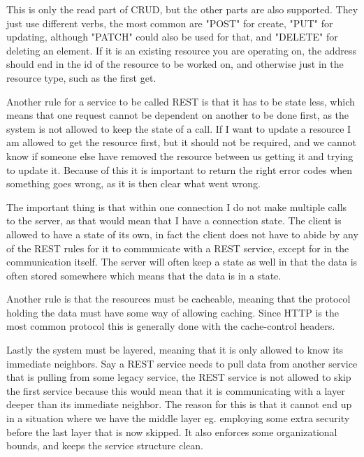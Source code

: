 This is only the read part of CRUD, but the other parts are also supported. They
just use different verbs, the most common are "POST" for create, "PUT" for
updating, although "PATCH" could also be used for that, and "DELETE" for
deleting an element. If it is an existing resource you are operating on, the
address should end in the id of the resource to be worked on, and otherwise just
in the resource type, such as the first get. 

Another rule for a service to be called REST is that it has to be state less,
which means that one request cannot be dependent on another to be done first, as
the system is not allowed to keep the state of a call. If I want to update a
resource I am allowed to get the resource first, but it should not be required,
and we cannot know if someone else have removed the resource between us getting
it and trying to update it. Because of this it is important to return the right
error codes when something goes wrong, as it is then clear what went wrong. 

The important thing is that within one connection I do not make multiple calls
to the server, as that would mean that I have a connection state. The client is
allowed to have a state of its own, in fact the client does not have to abide by
any of the REST rules for it to communicate with a REST service, except for in
the communication itself. The server will often keep a state as well in that the
data is often stored somewhere which means that the data is in a state. 

Another rule is that the resources must be cacheable, meaning that the protocol
holding the data must have some way of allowing caching. Since HTTP is the most
common protocol this is generally done with the cache-control
headers\cite{rest:elkstein:architeture}. 

Lastly the system must be layered\cite{rest:uci}, meaning that it is only
allowed to know its immediate neighbors. Say a REST service needs to pull data
from another service that is pulling from some legacy service, the REST service
is not allowed to skip the first service because this would mean that it is
communicating with a layer deeper than its immediate neighbor. The reason for
this is that it cannot end up in a situation where we have the middle layer eg.
employing some extra security before the last layer that is now skipped. It also
enforces some organizational bounds, and keeps the service structure clean. 

